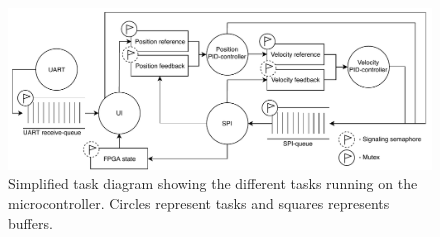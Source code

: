 \documentclass[../../main.tex]{subfiles}
\begin{document}
\begin{figure}[H]
    \centering
    \includegraphics[width=\textwidth]{Sections/System_Implementation/Images/Task diagram reduced.pdf}
    \caption{Simplified task diagram showing the different tasks running on the microcontroller. Circles represent tasks and squares represents buffers.}
    \label{fig:OverviewTaskDiagramSimple}
\end{figure}






\end{document}
